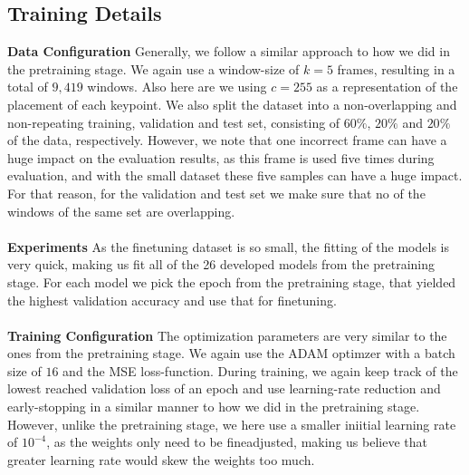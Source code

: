 \documentclass[./main.tex]{subfiles}
\begin{document}
\subsection{Training Details}
\textbf{Data Configuration} Generally, we follow a similar approach to how we did in the pretraining stage. We again use a window-size of $k = 5$ frames, resulting in a total of $9,419$ windows. Also here are we using $c = 255$ as a representation of the placement of each keypoint. We also split the dataset into a non-overlapping and non-repeating training, validation and test set, consisting of $60\%$, $20\%$ and $20\%$ of the data, respectively. However, we note that one incorrect frame can have a huge impact on the evaluation results, as this frame is used five times during evaluation, and with the small dataset these five samples can have a huge impact. For that reason, for the validation and test set we make sure that no of the windows of the same set are overlapping.
\\
\\
\textbf{Experiments} As the finetuning dataset is so small, the fitting of the models is very quick, making us fit all of the 26 developed models from the pretraining stage. For each model we pick the epoch from the pretraining stage, that yielded the highest validation accuracy and use that for finetuning.
\\
\\
\textbf{Training Configuration} The optimization parameters are very similar to the ones from the pretraining stage. We again use the ADAM optimzer with a batch size of $16$ and the MSE loss-function. During training, we again keep track of the lowest reached validation loss of an epoch and use learning-rate reduction and early-stopping in a similar manner to how we did in the pretraining stage. However, unlike the pretraining stage, we here use a smaller iniitial learning rate of $10^{-4}$, as the weights only need to be fineadjusted, making us believe that greater learning rate would skew the weights too much.
\end{document}
